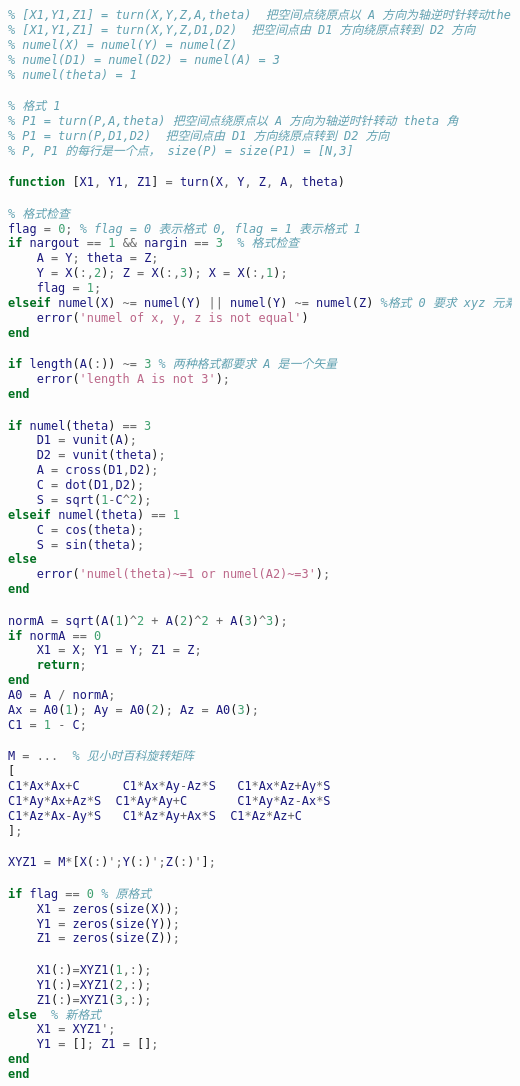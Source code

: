 
\begin{issues}
\issueNeedCite
\end{issues}



\begin{lstlisting}[language=matlab]
% 格式 0
% [X1,Y1,Z1] = turn(X,Y,Z,A,theta)  把空间点绕原点以 A 方向为轴逆时针转动theta角
% [X1,Y1,Z1] = turn(X,Y,Z,D1,D2)  把空间点由 D1 方向绕原点转到 D2 方向
% numel(X) = numel(Y) = numel(Z)
% numel(D1) = numel(D2) = numel(A) = 3
% numel(theta) = 1

% 格式 1
% P1 = turn(P,A,theta) 把空间点绕原点以 A 方向为轴逆时针转动 theta 角
% P1 = turn(P,D1,D2)  把空间点由 D1 方向绕原点转到 D2 方向
% P, P1 的每行是一个点， size(P) = size(P1) = [N,3]

function [X1, Y1, Z1] = turn(X, Y, Z, A, theta)

% 格式检查
flag = 0; % flag = 0 表示格式 0, flag = 1 表示格式 1
if nargout == 1 && nargin == 3  % 格式检查
    A = Y; theta = Z;
    Y = X(:,2); Z = X(:,3); X = X(:,1);
    flag = 1;
elseif numel(X) ~= numel(Y) || numel(Y) ~= numel(Z) %格式 0 要求 xyz 元素个数相同即可
    error('numel of x, y, z is not equal')
end

if length(A(:)) ~= 3 % 两种格式都要求 A 是一个矢量
    error('length A is not 3');
end

if numel(theta) == 3
    D1 = vunit(A);
    D2 = vunit(theta);
    A = cross(D1,D2);
    C = dot(D1,D2);
    S = sqrt(1-C^2);
elseif numel(theta) == 1
    C = cos(theta);
    S = sin(theta);
else
    error('numel(theta)~=1 or numel(A2)~=3'); 
end

normA = sqrt(A(1)^2 + A(2)^2 + A(3)^3);
if normA == 0
    X1 = X; Y1 = Y; Z1 = Z;
    return;
end
A0 = A / normA;
Ax = A0(1); Ay = A0(2); Az = A0(3);
C1 = 1 - C;

M = ...  % 见小时百科旋转矩阵
[
C1*Ax*Ax+C      C1*Ax*Ay-Az*S   C1*Ax*Az+Ay*S
C1*Ay*Ax+Az*S  C1*Ay*Ay+C       C1*Ay*Az-Ax*S
C1*Az*Ax-Ay*S   C1*Az*Ay+Ax*S  C1*Az*Az+C 
];

XYZ1 = M*[X(:)';Y(:)';Z(:)'];

if flag == 0 % 原格式
    X1 = zeros(size(X));
    Y1 = zeros(size(Y));
    Z1 = zeros(size(Z));

    X1(:)=XYZ1(1,:);
    Y1(:)=XYZ1(2,:);
    Z1(:)=XYZ1(3,:);
else  % 新格式
    X1 = XYZ1';
    Y1 = []; Z1 = [];
end
end
\end{lstlisting}
